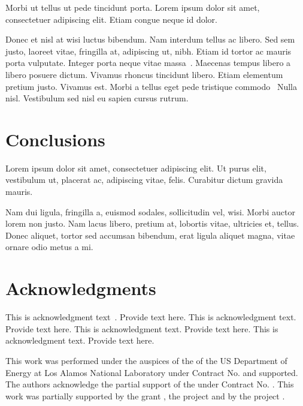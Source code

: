 \documentclass[proof]{WileyASNA-v1}
\begin{document}
Morbi ut tellus ut pede tincidunt porta. Lorem ipsum dolor sit amet, consectetuer adipiscing elit. Etiam congue neque id dolor.

Donec et nisl at wisi luctus bibendum. Nam interdum tellus ac libero. Sed sem justo, laoreet vitae, fringilla at,
adipiscing ut, nibh. Etiam id tortor ac mauris porta vulputate.
Integer porta neque vitae massa~\cite{Bettonvil2003}. Maecenas tempus libero a libero posuere dictum. Vivamus rhoncus tincidunt libero.
Etiam elementum pretium justo. Vivamus est. Morbi a tellus eget pede tristique commodo~\cite{Rutten2007} Nulla nisl. Vestibulum
sed nisl eu sapien cursus rutrum.

\section{Conclusions}\label{sec5}

Lorem ipsum dolor sit amet, consectetuer adipiscing elit. Ut purus elit, vestibulum ut, placerat ac, adipiscing vitae,
felis. Curabitur dictum gravida mauris. 

Nam dui ligula, fringilla a, euismod sodales, sollicitudin vel, wisi. Morbi auctor lorem non justo. Nam lacus libero,
pretium at, lobortis vitae, ultricies et, tellus. Donec aliquet, tortor sed accumsan bibendum, erat ligula aliquet magna,
vitae ornare odio metus a mi. 


\section*{Acknowledgments}

This is acknowledgment text~\cite{Paivio1975}. Provide text here. This is acknowledgment text. Provide text here. This is acknowledgment text. Provide text here. This is acknowledgment text. Provide text here. 

This work was performed under the auspices of the  of the US Department of Energy at Los Alamos National Laboratory under Contract No.  and supported. The authors acknowledge the partial support of the  under Contract No. . This work was partially supported by the  grant , the  project  and by the  project .
\end{document}
